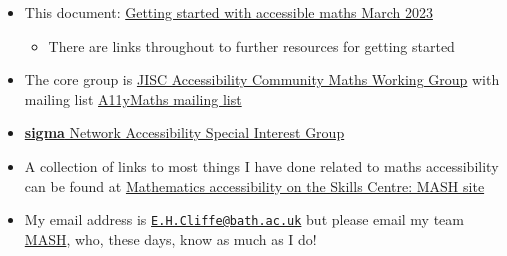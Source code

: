 \documentclass[
  10pt,
  a4paper]{article}
\providecommand{\tightlist}{%
  \setlength{\itemsep}{0pt}\setlength{\parskip}{0pt}}
\theoremstyle{plain}
\theoremstyle{plain}
\theoremstyle{plain}
\theoremstyle{plain}
\theoremstyle{plain}
\theoremstyle{definition}
\theoremstyle{definition}
\theoremstyle{definition}
\theoremstyle{remark}
\begin{document}
\begin{itemize}
\tightlist
\item
  This document: \href{}{Getting started with accessible maths March 2023}

  \begin{itemize}
  \tightlist
  \item
    There are links throughout to further resources for getting started
  \end{itemize}
\item
  The core group is \href{https://github.com/A11yMaths}{JISC Accessibility Community Maths Working Group} with mailing list \href{https://www.jiscmail.ac.uk/cgi-bin/webadmin?A0=ACCESSIBLE-MATHS}{A11yMaths mailing list}
\item
  \href{http://www.sigma-network.ac.uk/sigs/accessibility-sig/}{\textbf{sigma} Network Accessibility Special Interest Group}
\item
  A collection of links to most things I have done related to maths accessibility can be found at \href{https://www.bath.ac.uk/projects/mathematics-accessibility/}{Mathematics accessibility on the Skills Centre: MASH site}
\item
  My email address is \href{mailto:E.H.Cliffe@bath.ac.uk}{\nolinkurl{E.H.Cliffe@bath.ac.uk}} but please email my team \href{mailto:mash@bath.ac.uk}{MASH}, who, these days, know as much as I do!
\end{itemize}
\end{document}
